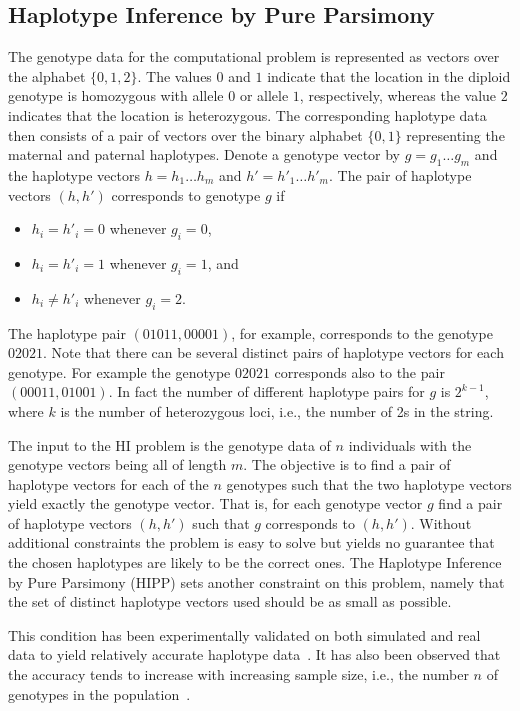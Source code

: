 \documentclass[12pt,a4paper]{article}
\begin{document}
\subsection{Haplotype Inference by Pure Parsimony}
The genotype data for the computational problem is represented as vectors over the alphabet $\{0, 1, 2\}$. 
The values $0$ and $1$ indicate that the location in the diploid genotype is homozygous with allele $0$ or allele $1$, respectively, 
whereas the value $2$ indicates that the location is heterozygous.
The corresponding haplotype data then consists of a pair of vectors over the binary alphabet $\{0, 1\}$ representing the maternal and paternal haplotypes.
Denote a genotype vector by $g=g_1\dots g_m$ and the haplotype vectors $h=h_1\dots h_m$ and $h'=h'_1\dots h'_m$.
The pair of haplotype vectors $(h, h')$ corresponds to genotype $g$ if 
\begin{itemize}
\item $h_i=h'_i=0$ whenever $g_i = 0$,
\item $h_i=h'_i=1$ whenever $g_i = 1$, and
\item $h_i \neq h'_i$ whenever $g_i = 2$.
\end{itemize}
The haplotype pair $(01011, 00001)$, for example, corresponds to the genotype $02021$.
Note that there can be several distinct pairs of haplotype vectors for each genotype.
For example the genotype $02021$ corresponds also to the pair $(00011, 01001)$.
In fact the number of different haplotype pairs for $g$ is $2^{k-1}$, where $k$ is the number of heterozygous loci, i.e., the number of 2s in the string.

The input to the HI problem is the genotype data of $n$ individuals with the genotype vectors being all of length $m$.
The objective is to find a pair of haplotype vectors for each of the $n$ genotypes such that the two haplotype vectors yield exactly the genotype vector.
That is, for each genotype vector $g$ find a pair of haplotype vectors $(h, h')$ such that $g$ corresponds to $(h, h')$.
Without additional constraints the problem is easy to solve but yields no guarantee that the chosen haplotypes are likely to be the correct ones.
The Haplotype Inference by Pure Parsimony (HIPP) sets another constraint on this problem, namely that the set of distinct haplotype vectors used should be as small as possible.

This condition has been experimentally validated on both simulated and real data to yield relatively accurate haplotype data~\cite{DBLP:journals/bioinformatics/WangX03a}.
It has also been observed that the accuracy tends to increase with increasing sample size, i.e., the number $n$ of genotypes in the population~\cite{DBLP:journals/bioinformatics/WangX03a}.
\end{document}
